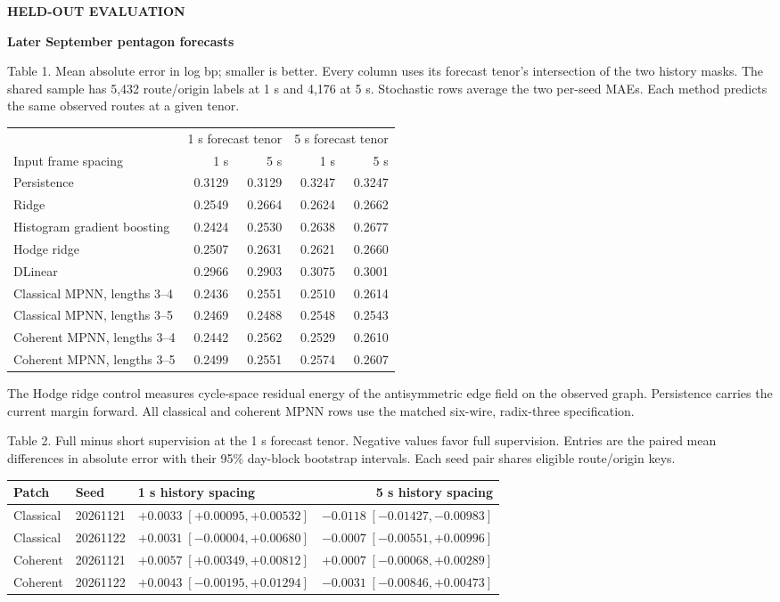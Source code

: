 \documentclass[10pt,letterpaper]{article}
\newcommand{\eyebrow}[1]{{\small\sffamily\bfseries\color{teal} #1}\par\vspace{3pt}}
\newcommand{\ttl}[1]{{\LARGE\sffamily\bfseries\color{ink}#1}\par\vspace{5pt}}
\newcommand{\sub}[1]{\par\vspace{7pt}{\large\sffamily\bfseries\color{ink}#1}\par\vspace{2pt}}
\newcommand{\captext}[1]{{\small #1}\par}
\begin{document}
\newpage
\eyebrow{HELD-OUT EVALUATION}
\ttl{Later September pentagon forecasts}
\captext{Table 1. Mean absolute error in log bp; smaller is better. Every column uses its forecast tenor's intersection of the two history masks. The shared sample has 5,432 route/origin labels at 1 s and 4,176 at 5 s. Stochastic rows average the two per-seed MAEs. Each method predicts the same observed routes at a given tenor.}
\begin{center}\begin{tabular}{@{}lrrrr@{}}\toprule
 & \multicolumn{2}{c}{1 s forecast tenor}&\multicolumn{2}{c}{5 s forecast tenor}\\
\cmidrule(lr){2-3}\cmidrule(l){4-5}
Input frame spacing&1 s&5 s&1 s&5 s\\\midrule
Persistence & 0.3129 & 0.3129 & 0.3247 & 0.3247\\
Ridge & 0.2549 & 0.2664 & 0.2624 & 0.2662\\
Histogram gradient boosting & 0.2424 & 0.2530 & 0.2638 & 0.2677\\
Hodge ridge & 0.2507 & 0.2631 & 0.2621 & 0.2660\\
DLinear & 0.2966 & 0.2903 & 0.3075 & 0.3001\\
\midrule Classical MPNN, lengths 3--4 & 0.2436 & 0.2551 & 0.2510 & 0.2614\\
Classical MPNN, lengths 3--5 & 0.2469 & 0.2488 & 0.2548 & 0.2543\\
Coherent MPNN, lengths 3--4 & 0.2442 & 0.2562 & 0.2529 & 0.2610\\
Coherent MPNN, lengths 3--5 & 0.2499 & 0.2551 & 0.2574 & 0.2607\\
\bottomrule\end{tabular}\end{center}
\captext{The Hodge ridge control measures cycle-space residual energy of the antisymmetric edge field on the observed graph. Persistence carries the current margin forward. All classical and coherent MPNN rows use the matched six-wire, radix-three specification.}
\sub{Effect of adding five-leg supervision}
\captext{Table 2. Full minus short supervision at the 1 s forecast tenor. Negative values favor full supervision. Entries are the paired mean differences in absolute error with their 95\% day-block bootstrap intervals. Each seed pair shares eligible route/origin keys.}
\begin{center}\begin{tabular}{@{}lllr@{}}\toprule
Patch & Seed & 1 s history spacing & 5 s history spacing\\\midrule
Classical & 20261121 & $+0.0033\;[+0.00095, +0.00532]$ & $-0.0118\;[-0.01427, -0.00983]$\\
Classical & 20261122 & $+0.0031\;[-0.00004, +0.00680]$ & $-0.0007\;[-0.00551, +0.00996]$\\
Coherent & 20261121 & $+0.0057\;[+0.00349, +0.00812]$ & $+0.0007\;[-0.00068, +0.00289]$\\
Coherent & 20261122 & $+0.0043\;[-0.00195, +0.01294]$ & $-0.0031\;[-0.00846, +0.00473]$\\
\bottomrule\end{tabular}\end{center}
\end{document}
